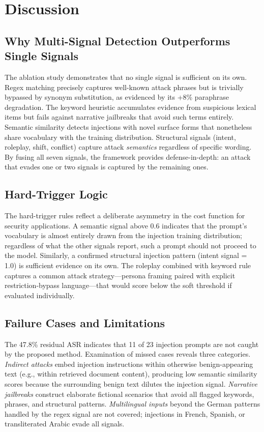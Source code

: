 \documentclass[10pt,conference]{IEEEtran}
\begin{document}
\section{Discussion}
\label{sec:discussion}

\subsection{Why Multi-Signal Detection Outperforms Single Signals}

The ablation study demonstrates that no single signal is sufficient
on its own.
Regex matching precisely captures well-known attack phrases but is
trivially bypassed by synonym substitution, as evidenced by its
+8\% paraphrase degradation.
The keyword heuristic accumulates evidence from suspicious lexical
items but fails against narrative jailbreaks that avoid such terms
entirely.
Semantic similarity detects injections with novel surface forms
that nonetheless share vocabulary with the training distribution.
Structural signals (intent, roleplay, shift, conflict) capture
attack \emph{semantics} regardless of specific wording.
By fusing all seven signals, the framework provides defense-in-depth:
an attack that evades one or two signals is captured by the remaining
ones.

\subsection{Hard-Trigger Logic}

The hard-trigger rules reflect a deliberate asymmetry in the cost
function for security applications.
A semantic signal above 0.6 indicates that the prompt's vocabulary
is almost entirely drawn from the injection training distribution;
regardless of what the other signals report, such a prompt should
not proceed to the model.
Similarly, a confirmed structural injection pattern (intent signal =
1.0) is sufficient evidence on its own.
The roleplay combined with keyword rule captures a common attack
strategy—persona framing paired with explicit restriction-bypass
language—that would score below the soft threshold if evaluated
individually.

\subsection{Failure Cases and Limitations}

The 47.8\% residual ASR indicates that 11 of 23 injection prompts
are not caught by the proposed method.
Examination of missed cases reveals three categories.
\emph{Indirect attacks} embed injection instructions within otherwise
benign-appearing text (e.g., within retrieved document content),
producing low semantic similarity scores because the surrounding
benign text dilutes the injection signal.
\emph{Narrative jailbreaks} construct elaborate fictional scenarios
that avoid all flagged keywords, phrases, and structural patterns.
\emph{Multilingual inputs} beyond the German patterns handled by the
regex signal are not covered; injections in French, Spanish, or
transliterated Arabic evade all signals.
\end{document}
